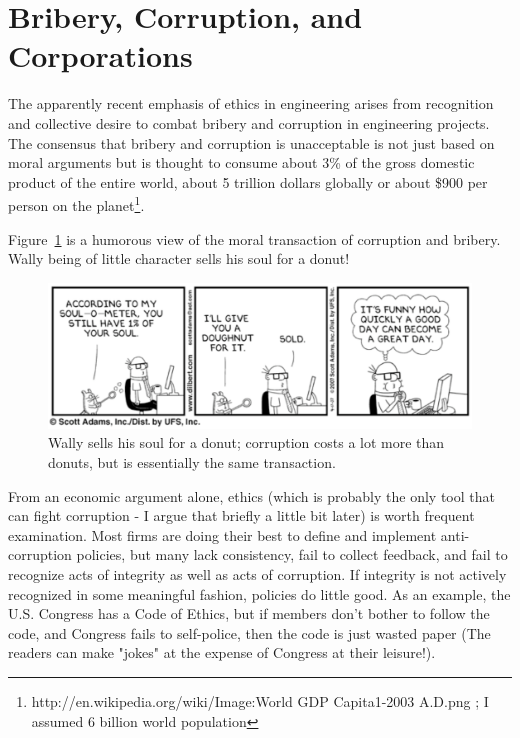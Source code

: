 \section*{Bribery, Corruption, and Corporations}
The apparently recent emphasis of ethics in engineering arises from recognition and collective desire to combat bribery and corruption in engineering projects.   The consensus that bribery and corruption is unacceptable is not just based on moral arguments but is thought to consume about 3\% of the gross domestic product of the entire world, about 5 trillion dollars globally or about \$900 per person on the planet\footnote{ http://en.wikipedia.org/wiki/Image:World GDP Capita1-2003 A.D.png ; I assumed 6 billion world population}. 

Figure~\ref{fig:soul_for_a_donut} is a humorous view of the moral transaction of corruption and bribery.  Wally being of little character sells his soul for a donut!

\begin{figure}[h!] %
   \centering
   \includegraphics[width=5in]{./figures/soul_for_a_donut.pdf} 
   \caption{Wally sells his soul for a donut; corruption costs a lot more than donuts, but is essentially the same transaction.}
   \label{fig:soul_for_a_donut}
\end{figure}

From an economic argument alone, ethics (which is probably the only tool that can fight corruption - I argue that briefly a little bit later) is worth frequent examination.  Most firms are doing their best to define and implement anti-corruption policies, but many lack consistency, fail to collect feedback, and fail to recognize acts of integrity as well as acts of corruption.   If integrity is not actively recognized in some meaningful fashion, policies do little good.  As an example, the U.S. Congress has a Code of Ethics, but if members don't bother to follow the code, and Congress fails to self-police, then the code is just wasted paper (The readers can make "jokes" at the expense of Congress at their leisure!). 

